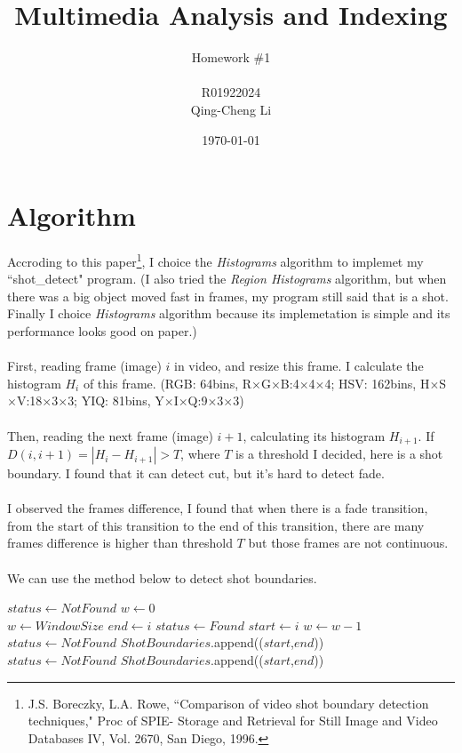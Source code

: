 \documentclass[11pt]{article}
\title{\textbf{Multimedia Analysis and Indexing}}
\author{Homework \#1\\
		\\
		R01922024\\
		Qing-Cheng Li}
\date{\today}
\begin{document}
\maketitle

\section{Algorithm}

Accroding to this paper\footnote{J.S. Boreczky, L.A. Rowe, ``Comparison of video shot boundary detection techniques," Proc of SPIE- Storage and Retrieval for Still Image and Video Databases IV, Vol. 2670, San Diego, 1996.}, I choice the \emph{Histograms} algorithm to implemet my ``shot\_detect" program. (I also tried the \emph{Region Histograms} algorithm, but when there was a big object moved fast in frames, my program still said that is a shot. Finally I choice \emph{Histograms} algorithm because its implemetation is simple and its performance looks good on paper.)
\\
\\
First, reading frame (image) $i$ in video, and resize this frame. I calculate the histogram $H_i$ of this frame. (RGB: 64bins, R$\times$G$\times$B:4$\times$4$\times$4; HSV: 162bins, H$\times$S$\times$V:18$\times$3$\times$3;  YIQ: 81bins, Y$\times$I$\times$Q:9$\times$3$\times$3)
\\
\\
Then, reading the next frame (image) $i+1$, calculating its histogram $H_{i+1}$. If $D(i,i+1) = | H_i - H_{i+1} | > T$, where $T$ is a threshold I decided, here is a shot boundary. I found that it can detect cut, but it's hard to detect fade.\\
\\
I observed the frames difference, I found that when there is a fade transition, from the start of this transition to the end of this transition, there are many frames difference is higher than threshold $T$ but those frames are not continuous.\\
\\
We can use the method below to detect shot boundaries.\\

\begin{algorithmic}
\State $status \gets NotFound$
\State $w \gets 0$\\
		\State $w \gets WindowSize$
		\State $end \gets i$
			\State $status \gets Found$
			\State $start \gets i$
		\EndIf
	\Else
				\State $w \gets w-1$
			\Else
				\State $status \gets NotFound$
				\State $ShotBoundaries$.append(($start$,$end$))
			\EndIf
		\EndIf
	\EndIf
\EndFor\\
	\State $status \gets NotFound$
	\State $ShotBoundaries$.append(($start$,$end$))
\EndIf
\end{algorithmic}
\end{document}

